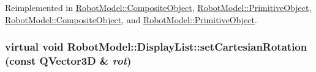 Reimplemented in \hyperlink{class_robot_model_1_1_composite_object_a12e8961ebc63d8a253d915b29b356162}{RobotModel::CompositeObject}, \hyperlink{class_robot_model_1_1_primitive_object_a0a7cfefb126e4f37c208c516f8ffd9bb}{RobotModel::PrimitiveObject}, \hyperlink{class_robot_model_1_1_composite_object_a2e4886f283bbf8741c41a066241a1e55}{RobotModel::CompositeObject}, and \hyperlink{class_robot_model_1_1_primitive_object_afa2afdbe412aadfe4d7bb951e4d7b8fa}{RobotModel::PrimitiveObject}.\hypertarget{class_robot_model_1_1_display_list_a7d52ea010f54755bcb3bfae9e26dd0c2}{
\subsubsection[{setCartesianRotation}]{\setlength{\rightskip}{0pt plus 5cm}virtual void RobotModel::DisplayList::setCartesianRotation (const QVector3D \& {\em rot})}}
\label{class_robot_model_1_1_display_list_a7d52ea010f54755bcb3bfae9e26dd0c2}


